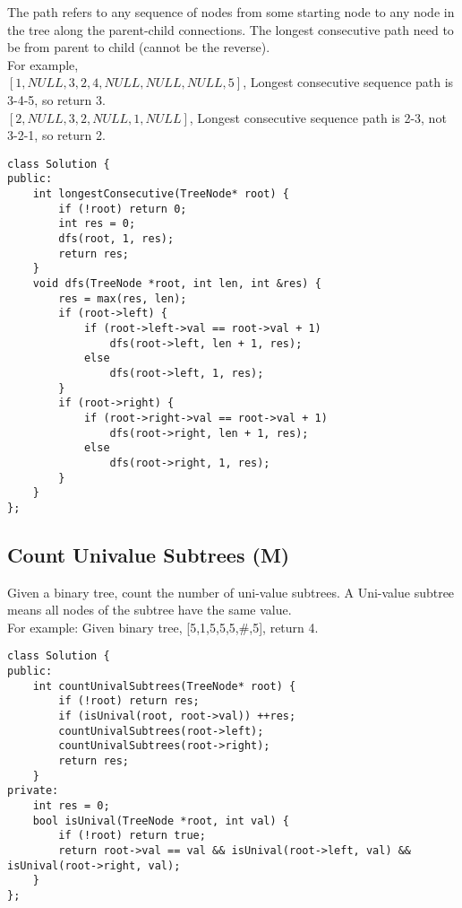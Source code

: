 The path refers to any sequence of nodes from some starting node to any node in the tree along the parent-child connections. The longest consecutive path need to be from parent to child (cannot be the reverse).\\

For example, \\
$[1, NULL, 3, 2, 4, NULL, NULL, NULL, 5]$, Longest consecutive sequence path is 3-4-5, so return 3. \\
$[2, NULL, 3, 2, NULL, 1, NULL]$, Longest consecutive sequence path is 2-3, not 3-2-1, so return 2. \\

\begin{lstlisting}
class Solution {
public:
    int longestConsecutive(TreeNode* root) {
        if (!root) return 0;
        int res = 0;
        dfs(root, 1, res);
        return res;
    }
    void dfs(TreeNode *root, int len, int &res) {
        res = max(res, len);
        if (root->left) {
            if (root->left->val == root->val + 1) 
                dfs(root->left, len + 1, res);
            else 
                dfs(root->left, 1, res);
        }
        if (root->right) {
            if (root->right->val == root->val + 1) 
                dfs(root->right, len + 1, res);
            else 
                dfs(root->right, 1, res);
        }
    }
};
\end{lstlisting}


\subsection{Count Univalue Subtrees (M)}
Given a binary tree, count the number of uni-value subtrees. A Uni-value subtree means all nodes of the subtree have the same value. \\

For example: Given binary tree, [5,1,5,5,5,\#,5], return 4.\\

\begin{lstlisting}
class Solution {
public:
    int countUnivalSubtrees(TreeNode* root) {
        if (!root) return res;
        if (isUnival(root, root->val)) ++res;
        countUnivalSubtrees(root->left);
        countUnivalSubtrees(root->right);
        return res;
    }
private:
    int res = 0;
    bool isUnival(TreeNode *root, int val) {
        if (!root) return true;
        return root->val == val && isUnival(root->left, val) && isUnival(root->right, val);
    }
};
\end{lstlisting}


